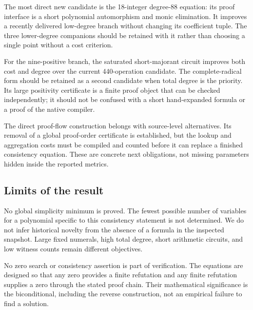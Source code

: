 \documentclass[11pt]{article}
\theoremstyle{definition}
\theoremstyle{remark}
\begin{document}
The most direct new candidate is the 18-integer degree-88 equation: its
proof interface is a short polynomial automorphism and monic elimination.
It improves a recently delivered low-degree branch without changing its
coefficient tuple. The three lower-degree companions should be retained
with it rather than choosing a single point without a cost criterion.

For the nine-positive branch, the saturated short-majorant circuit improves
both cost and degree over the current 440-operation candidate. The
complete-radical form should be retained as a second candidate when total
degree is the priority. Its large positivity certificate is a finite
proof object that can be checked independently; it should not be confused
with a short hand-expanded formula or a proof of the native compiler.

The direct proof-flow construction belongs with source-level alternatives.
Its removal of a global proof-order certificate is established, but the
lookup and aggregation costs must be compiled and counted before it can
replace a finished consistency equation. These are concrete next
obligations, not missing parameters hidden inside the reported metrics.

\subsection{Limits of the result}

No global simplicity minimum is proved. The fewest possible number of
variables for a polynomial specific to this consistency statement is not
determined. We do not infer historical novelty from the absence of a formula
in the inspected snapshot. Large fixed numerals, high total degree, short
arithmetic circuits, and low witness counts remain different objectives.

No zero search or consistency assertion is part of verification. The
equations are designed so that any zero provides a finite refutation and
any finite refutation supplies a zero through the stated proof chain.
Their mathematical significance is the biconditional, including the
reverse construction, not an empirical failure to find a solution.
\end{document}
